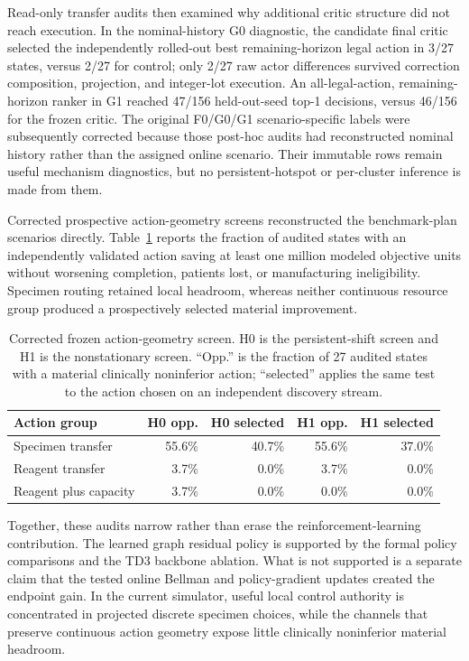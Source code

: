 \documentclass[preprint,review,12pt]{elsarticle}
\begin{document}
Read-only transfer audits then examined why additional critic structure did not
reach execution. In the nominal-history G0 diagnostic, the candidate final
critic selected the independently rolled-out best remaining-horizon legal
action in 3/27 states, versus 2/27 for control; only 2/27 raw actor differences
survived correction composition, projection, and integer-lot execution. An
all-legal-action, remaining-horizon ranker in G1 reached 47/156 held-out-seed
top-1 decisions, versus 46/156 for the frozen critic. The original F0/G0/G1
scenario-specific labels were subsequently corrected because those post-hoc
audits had reconstructed nominal history rather than the assigned online
scenario. Their immutable rows remain useful mechanism diagnostics, but no
persistent-hotspot or per-cluster inference is made from them.

Corrected prospective action-geometry screens reconstructed the benchmark-plan
scenarios directly. Table~\ref{tab:action_geometry} reports the
fraction of audited states with an independently validated action saving at
least one million modeled objective units without worsening completion,
patients lost, or manufacturing ineligibility. Specimen routing retained local
headroom, whereas neither continuous resource group produced a prospectively
selected material improvement.

\begin{table}[htbp]
\centering
\caption{Corrected frozen action-geometry screen. H0 is the persistent-shift
screen and H1 is the nonstationary screen. ``Opp.'' is the fraction of 27
audited states with a material clinically noninferior action; ``selected''
applies the same test to the action chosen on an independent discovery stream.}
\label{tab:action_geometry}
\begin{tabular}{lrrrr}
\hline
Action group & H0 opp. & H0 selected & H1 opp. & H1 selected \\
\hline
Specimen transfer & 55.6\% & 40.7\% & 55.6\% & 37.0\% \\
Reagent transfer & 3.7\% & 0.0\% & 3.7\% & 0.0\% \\
Reagent plus capacity & 3.7\% & 0.0\% & 0.0\% & 0.0\% \\
\hline
\end{tabular}
\end{table}

Together, these audits narrow rather than erase the reinforcement-learning
contribution. The learned graph residual policy is supported by the formal
policy comparisons and the TD3 backbone ablation. What is not supported is a
separate claim that the tested online Bellman and policy-gradient updates
created the endpoint gain. In the current simulator, useful local control
authority is concentrated in projected discrete specimen choices, while the
channels that preserve continuous action geometry expose little clinically
noninferior material headroom.
\end{document}

